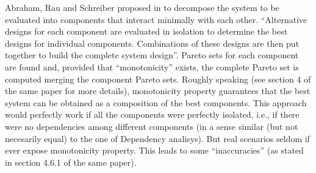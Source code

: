 Abraham, Rau and Schreiber proposed in \cite{santosh_hptr00} to decompose
the system to be evaluated into components that interact minimally
with each other. ``Alternative designs for each component are evaluated
in isolation to determine the best designs for individual components.
Combinations of these designs are then put together to build the complete
system design''. Pareto sets for each component are found and, provided
that ``monotonicity'' exists, the complete Pareto set is computed
merging the component Pareto sets. Roughly speaking (see section 4
of the same paper for more details), monotonicity property guarantees
that the best system can be obtained as a composition of the best
components. This approach would perfectly work if all the components
were perfectly isolated, i.e., if there were no dependencies among
different components (in a sense similar (but not necesarily equal)
to the one of Dependency analisys). But real scenarios seldom if ever
expose monotonicity property. This leads to some ``inaccuracies''
(as stated in section 4.6.1 of the same paper).

